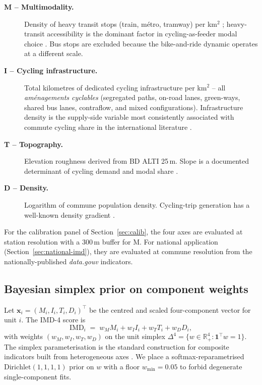\documentclass[11pt,a4paper]{article}
\newcommand{\IMD}{\mathrm{IMD}}
\begin{document}
\begin{description}
    \item[\textbf{M -- Multimodality.}]  Density of heavy transit
          stops (train, m\'etro, tramway) per km$^2$ ;
          heavy-transit accessibility is the dominant factor in
          cycling-as-feeder modal choice
          \citep{Martens2007,Saberi2018}.
          Bus stops are excluded because the bike-and-ride
          dynamic operates at a different scale.

    \item[\textbf{I -- Cycling infrastructure.}]  Total kilometres
          of dedicated cycling infrastructure per km$^2$ -- all
          \emph{am\'enagements cyclables} (segregated paths,
          on-road lanes, green-ways, shared bus lanes, contraflow,
          and mixed configurations).  Infrastructure density is
          the supply-side variable most consistently associated
          with commute cycling share in the international
          literature \citep{Schoner2014,Parkin2008,Heinen2010}.

    \item[\textbf{T -- Topography.}]  Elevation roughness derived
          from BD ALTI 25\,m.  Slope is a documented determinant
          of cycling demand and modal share
          \citep{Parkin2008,Rietveld2004}.

    \item[\textbf{D -- Density.}]  Logarithm of commune population
          density.  Cycling-trip generation has a well-known
          density gradient
          \citep{FaghihImani2014,Rietveld2004}.
\end{description}

For the calibration panel of Section~\ref{sec:calib}, the four
axes are evaluated at station resolution with a $300$\,m buffer
for M.  For national application
(Section~\ref{sec:national-imd}), they are evaluated at commune
resolution from the nationally-published
\emph{data.gouv} indicators.

\subsection{Bayesian simplex prior on component weights}
\label{sec:bayes}

Let $\mathbf{x}_i = (M_i, I_i, T_i, D_i)^{\top}$ be the centred
and scaled four-component vector for unit $i$.  The IMD-4 score is
\[
    \IMD_i \;=\; w_M M_i + w_I I_i + w_T T_i + w_D D_i,
\]
with weights $(w_M, w_I, w_T, w_D)$ on the unit simplex
$\Delta^4 = \{w \in \mathbb{R}_+^4 : \mathbf{1}^{\top} w = 1\}$.
The simplex parameterisation is the standard construction for
composite indicators built from heterogeneous axes
\citep{OECD2008,Saisana2005}.  We place a softmax-reparametrised
$\text{Dirichlet}(1,1,1,1)$ prior on $w$ with a floor
$w_{\min} = 0.05$ to forbid degenerate single-component fits.
\end{document}
